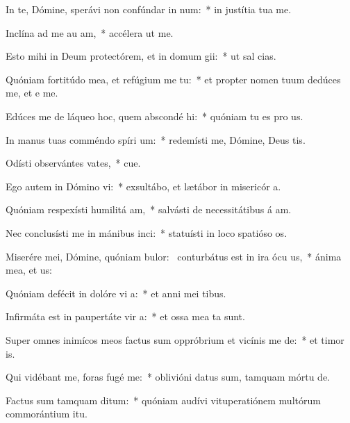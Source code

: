 \item In te, Dómine, sperávi non confúndar in num:~* in justítia tua  me.
\item Inclína ad me au am,~* accélera ut  me.
\item Esto mihi in Deum protectórem, et in domum gii:~* ut sal  cias.
\item Quóniam fortitúdo mea, et refúgium me  tu:~* et propter nomen tuum dedúces me, et e me.
\item Edúces me de láqueo hoc, quem abscondé hi:~* quóniam tu es pro us.
\item In manus tuas comméndo spíri um:~* redemísti me, Dómine, Deus tis.
\item Odísti observántes vates,~* cue.
\item Ego autem in Dómino vi:~* exsultábo, et lætábor in misericór a.
\item Quóniam respexísti humilitá am,~* salvásti de necessitátibus á am.
\item Nec conclusísti me in mánibus inci:~* statuísti in loco spatióso  os.
\item Miserére mei, Dómine, quóniam bulor:~\pscross{} conturbátus est in ira ócu us,~* ánima mea, et  us:
\item Quóniam defécit in dolóre vi a:~* et anni mei  tibus.
\item Infirmáta est in paupertáte vir a:~* et ossa mea ta sunt.
\item Super omnes inimícos meos factus sum oppróbrium et vicínis me de:~* et timor  is.
\item Qui vidébant me, foras fugé  me:~* oblivióni datus sum, tamquam mórtu  de.
\item Factus sum tamquam  ditum:~* quóniam audívi vituperatiónem multórum commorántium  itu.
